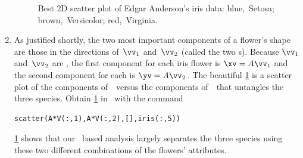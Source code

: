 \begin{example}
\begin{solution}
\begin{enumerate}
\begin{figure}
\centering
{}
\caption{Best 2D scatter plot of Edgar Anderson's iris data: blue,~Setosa; brown,~Versicolor; red,~Virginia. }
\label{fig:eaidpca}
\end{figure}%
\item As justified shortly, the two most important components of a flower's shape are those in the directions of~\(\vv_1\) and~\(\vv_2\) (called the two s).
Because \(\vv_1\) and~\(\vv_2\) are , the first component for each iris flower is \(\xv=A\vv_1\) and the second component for each is \(\yv=A\vv_2\)\,.
The beautiful \cref{fig:eaidpca} is a scatter plot of the components of~\yv\ versus the components of~\xv\ that untangles the three species.
Obtain \cref{fig:eaidpca} in \script\ with the command
\begin{verbatim}
scatter(A*V(:,1),A*V(:,2),[],iris(:,5))
\end{verbatim}
\cref{fig:eaidpca} shows that our \svd\ based analysis largely separates the three species using these two different combinations of the flowers' attributes.
\end{enumerate}
\end{solution}
\end{example}




